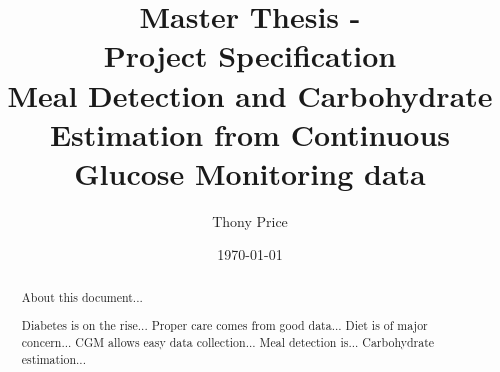\documentclass{kththesis}
\title{%
    Master Thesis - \\
    Project Specification \\
    \vspace{.5em}
    \large Meal Detection and Carbohydrate Estimation from Continuous Glucose Monitoring data \\
}
\author{Thony Price}
\date{\today}
\begin{document}
\frontmatter
\titlepage

\begin{abstract}
  About this document...

  Diabetes is on the rise...
  Proper care comes from good data...
  Diet is of major concern...
  CGM allows easy data collection...
  Meal detection is...
  Carbohydrate estimation...
\end{abstract}

\tableofcontents
\mainmatter





\printbibliography[heading=bibintoc]
\end{document}
